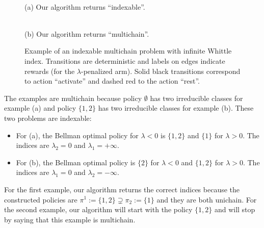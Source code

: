 \begin{figure}[ht]
    \centering
    \begin{minipage}{.35\linewidth}
        \centering
        \\
        (a) Our algorithm returns ``indexable''.
    \end{minipage}\qquad 
    \begin{minipage}{.35\linewidth}
        \centering
        \\
        (b) Our algorithm returns ``multichain''.
    \end{minipage}
    
    \caption{Example of an indexable multichain problem with infinite Whittle index. Transitions are deterministic and labels on edges indicate rewards (for the $\lambda$-penalized arm). Solid black transitions correspond to action ``activate''  and dashed red to the action ``rest''.}
    \label{fig:example_multichain}
\end{figure} 
The examples are multichain because policy $\emptyset$ has two irreducible classes for example (a) and policy $\{1,2\}$ has two irreducible classes for example (b). These two problems are indexable:
\begin{itemize}
    \item For (a), the Bellman optimal policy for $\lambda<0$ is $\{1,2\}$ and $\{1\}$ for $\lambda>0$. The indices are $\lambda_2=0$ and $\lambda_1=+\infty$.
    \item For (b), the  Bellman optimal policy is $\{2\}$ for $\lambda<0$  and $\{1,2\}$ for $\lambda>0$. The indices are $\lambda_1=0$ and $\lambda_2=-\infty$.
\end{itemize}
For the first example, our algorithm returns the correct indices because the constructed policies are $\pi^1:=\{1,2\}\supsetneq\pi_2:=\{1\}$ and they are both unichain.  For the second example, our algorithm will start with the policy $\{1,2\}$ and will stop by saying that this example is multichain.

